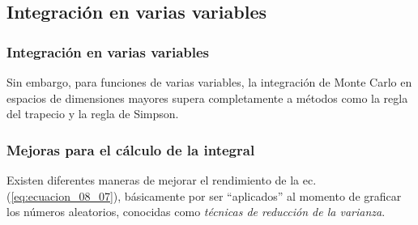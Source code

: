 \subsection{Integración en varias variables}
\begin{frame}
\frametitle{Integración en varias variables}
Sin embargo, para funciones de varias variables, la integración de Monte Carlo en espacios de dimensiones mayores supera completamente a métodos como la regla del trapecio y la regla de Simpson.
\end{frame}
\begin{frame}
\frametitle{Mejoras para el cálculo de la integral}
Existen diferentes maneras de mejorar el rendimiento de la ec. (\ref{eq:ecuacion_08_07}), básicamente por ser \enquote{aplicados} al momento de graficar los números aleatorios, conocidas como \emph{técnicas de reducción de la varianza}.
\end{frame}
